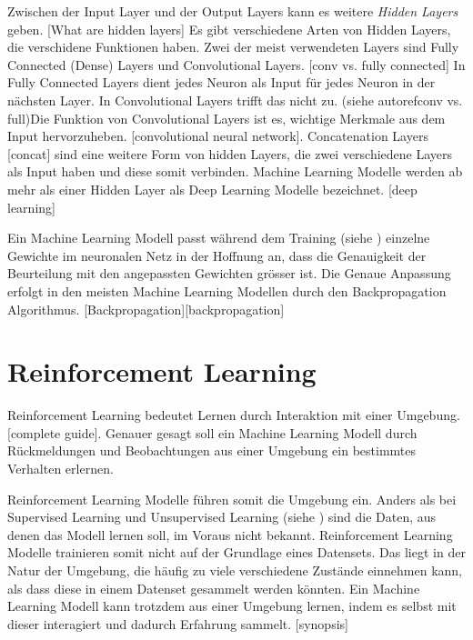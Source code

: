 Zwischen der Input Layer und der Output Layers kann es weitere \emph{Hidden
Layers} geben. [What are hidden layers] Es gibt verschiedene Arten von Hidden
Layers, die verschidene Funktionen haben. Zwei der meist verwendeten Layers sind
Fully Connected (Dense) Layers und Convolutional Layers. [conv vs. fully
connected] In Fully Connected Layers dient jedes Neuron als Input für jedes
Neuron in der nächsten Layer. In Convolutional Layers trifft das nicht zu.
(siehe autoref{conv vs. full})Die Funktion von Convolutional Layers ist es,
wichtige Merkmale aus dem Input hervorzuheben. [convolutional neural network].
Concatenation Layers [concat] sind eine weitere Form von hidden Layers, die zwei
verschiedene Layers als Input haben und diese somit verbinden. Machine Learning
Modelle werden ab mehr als einer Hidden Layer als Deep Learning Modelle
bezeichnet. [deep learning]


Ein Machine Learning Modell passt während dem Training (siehe
) einzelne Gewichte im neuronalen Netz in der
Hoffnung an, dass die Genauigkeit der Beurteilung mit den angepassten Gewichten
grösser ist. Die Genaue Anpassung erfolgt in den meisten Machine Learning
Modellen durch den Backpropagation Algorithmus. [Backpropagation][backpropagation]

\section{Reinforcement Learning}
\label{chap:t_rl}
Reinforcement Learning bedeutet Lernen durch Interaktion mit einer Umgebung.
[complete guide]. Genauer gesagt soll ein Machine Learning Modell durch
Rückmeldungen und Beobachtungen aus einer Umgebung ein bestimmtes Verhalten
erlernen.

Reinforcement Learning Modelle führen somit die Umgebung ein. Anders als bei
Supervised Learning und Unsupervised Learning (siehe ) sind
die Daten, aus denen das Modell lernen soll, im Voraus nicht bekannt.
Reinforcement Learning Modelle trainieren somit nicht auf der Grundlage eines
Datensets. Das liegt in der Natur der Umgebung, die häufig zu viele verschiedene
Zustände einnehmen kann, als dass diese in einem Datenset gesammelt werden
könnten. Ein Machine Learning Modell kann trotzdem aus einer Umgebung lernen,
indem es selbst mit dieser interagiert und dadurch Erfahrung sammelt. [synopsis]

